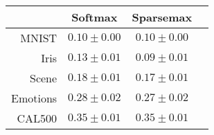 \begin{tabular}{r|ccc}
& Softmax & Sparsemax \\
\hline
MNIST & $0.10 \pm 0.00$ & $0.10 \pm 0.00$ \\
Iris & $0.13 \pm 0.01$ & $0.09 \pm 0.01$ \\
Scene & $0.18 \pm 0.01$ & $0.17 \pm 0.01$ \\
Emotions & $0.28 \pm 0.02$ & $0.27 \pm 0.02$ \\
CAL500 & $0.35 \pm 0.01$ & $0.35 \pm 0.01$ \\
\end{tabular}
